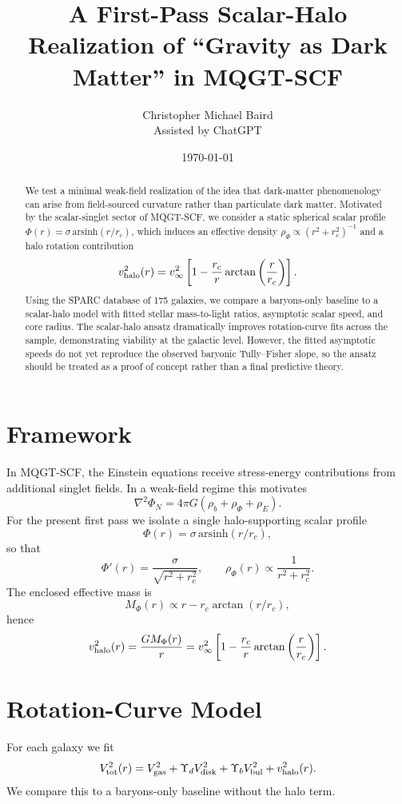 \documentclass[11pt]{article}
\title{A First-Pass Scalar-Halo Realization of ``Gravity as Dark Matter'' in MQGT-SCF}
\author{Christopher Michael Baird \\ Assisted by ChatGPT}
\date{\today}
\begin{document}
\maketitle

\begin{abstract}
We test a minimal weak-field realization of the idea that dark-matter phenomenology can arise from field-sourced curvature rather than particulate dark matter. Motivated by the scalar-singlet sector of MQGT-SCF, we consider a static spherical scalar profile $\Phi(r)=\sigma\,\mathrm{arsinh}(r/r_c)$, which induces an effective density $\rho_\Phi \propto (r^2+r_c^2)^{-1}$ and a halo rotation contribution
\[
v_{\rm halo}^2(r)=v_\infty^2\left[1-\frac{r_c}{r}\arctan\left(\frac{r}{r_c}\right)\right].
\]
Using the SPARC database of 175 galaxies, we compare a baryons-only baseline to a scalar-halo model with fitted stellar mass-to-light ratios, asymptotic scalar speed, and core radius. The scalar-halo ansatz dramatically improves rotation-curve fits across the sample, demonstrating viability at the galactic level. However, the fitted asymptotic speeds do not yet reproduce the observed baryonic Tully--Fisher slope, so the ansatz should be treated as a proof of concept rather than a final predictive theory.
\end{abstract}

\section{Framework}
In MQGT-SCF, the Einstein equations receive stress-energy contributions from additional singlet fields. In a weak-field regime this motivates
\[
\nabla^2\Phi_N = 4\pi G\left(\rho_b+\rho_{\Phi}+\rho_E\right).
\]
For the present first pass we isolate a single halo-supporting scalar profile
\[
\Phi(r)=\sigma\,\mathrm{arsinh}(r/r_c),
\]
so that
\[
\Phi'(r)=\frac{\sigma}{\sqrt{r^2+r_c^2}},
\qquad
\rho_\Phi(r)\propto \frac{1}{r^2+r_c^2}.
\]
The enclosed effective mass is
\[
M_\Phi(r)\propto r-r_c\arctan(r/r_c),
\]
hence
\[
v_{\rm halo}^2(r)=\frac{GM_\Phi(r)}{r}
= v_\infty^2\left[1-\frac{r_c}{r}\arctan\left(\frac{r}{r_c}\right)\right].
\]

\section{Rotation-Curve Model}
For each galaxy we fit
\[
V_{\rm tot}^2(r)=V_{\rm gas}^2 + \Upsilon_d V_{\rm disk}^2 + \Upsilon_b V_{\rm bul}^2 + v_{\rm halo}^2(r).
\]
We compare this to a baryons-only baseline without the halo term.
\end{document}
